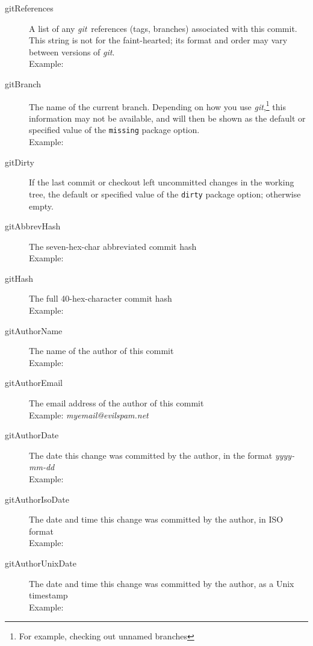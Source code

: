\documentclass[a4paper,12pt,twoside,openany]{memoir}
\makeatletter
\newcommand{\sfit}[1]{\textit{#1}}
\newcommand{\git}{\sfit{git}}
\newcommand*{\emailat}{@}
\makeatother
\begin{document}
\begin{description}

\item[gitReferences]
    A list of any \git\ references (tags, branches) associated
    with this commit.
    This string is not for the faint-hearted;
    its format and order may vary between versions of \git.\\
    Example:\\\textit{\small\gitReferences}

\item[gitBranch]
    The name of the current branch.
    Depending on how you use \git,\footnote{For example, checking out unnamed branches}
    this information may not be available,
    and will then be shown as the default or specified value of
    the \texttt{missing} package option.\\
    Example: \textit{\gitBranch}

\item[gitDirty]
    If the last commit or checkout left uncommitted changes in the working tree,
    the default or specified value of the \texttt{dirty} package option;
    otherwise empty.

\item[gitAbbrevHash]
    The seven-hex-char abbreviated commit hash\\
    Example: \textit{\gitAbbrevHash}

\item[gitHash]
    The full 40-hex-character commit hash\\
    Example: \textit{\gitHash}

\item[gitAuthorName]
    The name of the author of this commit\\
    Example: \textit{\gitAuthorName}

\item[gitAuthorEmail]
    The email address of the author of this commit\\
    Example: \textit{myemail\emailat evilspam.net}

\item[gitAuthorDate]
    The date this change was committed by the author,
    in the format \textit{yyyy-mm-dd}\\
    Example: \textit{\gitAuthorDate}

\item[gitAuthorIsoDate]
    The date and time this change was committed by the author,
    in ISO format\\
    Example: \textit{\gitAuthorIsoDate}
\clearpage
\item[gitAuthorUnixDate]
    The date and time this change was committed by the author,
    as a Unix timestamp\\
    Example: \textit{\gitAuthorUnixDate}


\end{description}
\end{document}
